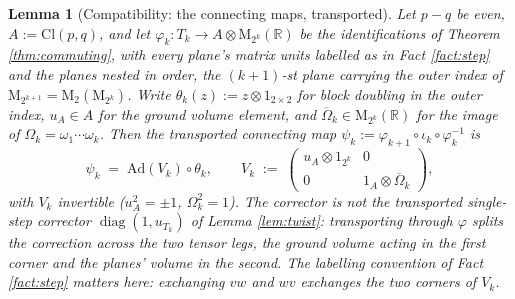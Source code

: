 \documentclass[11pt]{article}
\newtheorem{lemma}[theorem]{Lemma}
\theoremstyle{definition}
\newcommand{\Cl}{\mathrm{Cl}}
\newcommand{\R}{\mathbb{R}}
\newcommand{\Mat}{\mathrm{M}}
\newcommand{\Ad}{\mathrm{Ad}}
\begin{document}
\begin{lemma}[Compatibility: the connecting maps, transported]\label{lem:compat}
Let $p - q$ be even, $A := \Cl(p,q)$, and let $\varphi_k : T_k \to A \otimes \Mat_{2^k}(\R)$ be the identifications of Theorem \ref{thm:commuting}, with every plane's matrix units labelled as in Fact \ref{fact:step} and the planes nested in order, the $(k{+}1)$-st plane carrying the outer index of $\Mat_{2^{k+1}} = \Mat_2(\Mat_{2^k})$. Write $\theta_k(z) := z \otimes 1_{2 \times 2}$ for block doubling in the outer index, $u_A \in A$ for the ground volume element, and $\overline\Omega_k \in \Mat_{2^k}(\R)$ for the image of $\Omega_k = \omega_1 \cdots \omega_k$. Then the transported connecting map $\psi_k := \varphi_{k+1} \circ \iota_k \circ \varphi_k^{-1}$ is
\[
\psi_k \;=\; \Ad(V_k) \circ \theta_k, \qquad
V_k \;:=\; \begin{pmatrix} u_A \otimes 1_{2^k} & 0 \\ 0 & 1_A \otimes \overline\Omega_k \end{pmatrix},
\]
with $V_k$ invertible ($u_A^2 = \pm 1$, $\Omega_k^2 = 1$). The corrector is \emph{not} the transported single-step corrector $\operatorname{diag}(1, u_{T_k})$ of Lemma \ref{lem:twist}: transporting through $\varphi$ splits the correction across the two tensor legs, the ground volume acting in the first corner and the planes' volume in the second. The labelling convention of Fact \ref{fact:step} matters here: exchanging $vw$ and $wv$ exchanges the two corners of $V_k$.
\end{lemma}
\end{document}
